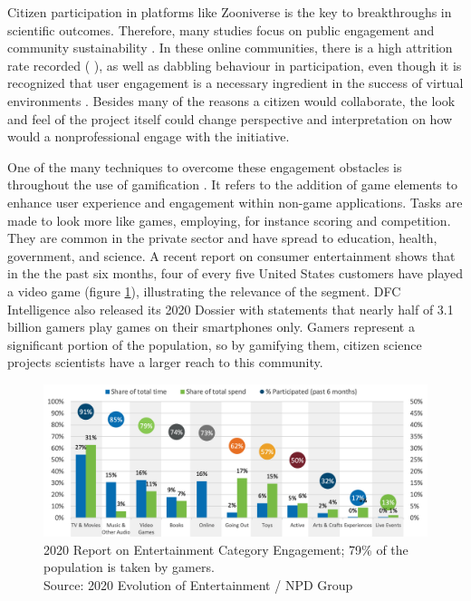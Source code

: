 Citizen participation in platforms like Zooniverse is the key to breakthroughs in scientific outcomes. Therefore, many studies focus on public engagement and community sustainability \cite{aristeidou2017profiles}. In these online communities, there is a high attrition rate recorded (\cite{nov2011technology} \cite{ponciano2015finding}), as well as dabbling behaviour \cite{eveleigh2014designing} in participation, even though it is recognized that user engagement is a necessary ingredient in the success of virtual environments \cite{verhagen2015benefitting}. Besides many of the reasons a citizen would collaborate, the look and feel of the project itself could change perspective and interpretation on how would a nonprofessional engage with the initiative.

One of the many techniques to overcome these engagement obstacles is throughout the use of gamification \cite{bowser2013using}. It refers to the addition of game elements to enhance user experience and engagement within non-game applications. Tasks are made to look more like games, employing, for instance scoring and competition. They are common in the private sector and have spread to education, health, government, and science. A recent report on consumer entertainment shows that in the the past six months, four of every five United States customers have played a video game (figure \ref{fig:entertainment-report}), illustrating the relevance of the segment. DFC Intelligence also released its 2020 Dossier with statements that nearly half of 3.1 billion gamers play games on their smartphones only. Gamers represent a significant portion of the population, so by gamifying them, citizen science projects scientists have a larger reach to this community.

\begin{figure}[ht]
    \centering
    \includegraphics[width=\linewidth]{images/game.png}
    \caption{2020 Report on Entertainment Category Engagement; 79\% of the population is taken by gamers.\\ Source: 2020 Evolution of Entertainment / NPD Group}
    \label{fig:entertainment-report}
\end{figure}

